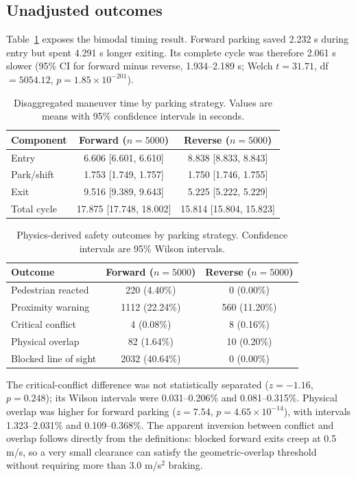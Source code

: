 \documentclass[11pt]{article}
\begin{document}
\subsection{Unadjusted outcomes}

Table~\ref{tab:time} exposes the bimodal timing result. Forward parking saved 2.232 s during entry but spent 4.291 s longer exiting. Its complete cycle was therefore 2.061 s slower (95\% CI for forward minus reverse, 1.934--2.189 s; Welch $t=31.71$, df $=5054.12$, $p=1.85\times10^{-201}$).

\begin{table}[ht]
\centering
\caption{Disaggregated maneuver time by parking strategy. Values are means with 95\% confidence intervals in seconds.}
\label{tab:time}
\begin{tabular}{lcc}
\toprule
Component & Forward ($n=5000$) & Reverse ($n=5000$)\\
\midrule
Entry & 6.606 [6.601, 6.610] & 8.838 [8.833, 8.843]\\
Park/shift & 1.753 [1.749, 1.757] & 1.750 [1.746, 1.755]\\
Exit & 9.516 [9.389, 9.643] & 5.225 [5.222, 5.229]\\
Total cycle & 17.875 [17.748, 18.002] & 15.814 [15.804, 15.823]\\
\bottomrule
\end{tabular}
\end{table}

\begin{table}[ht]
\centering
\caption{Physics-derived safety outcomes by parking strategy. Confidence intervals are 95\% Wilson intervals.}
\label{tab:results}
\begin{tabular}{lcc}
\toprule
Outcome & Forward ($n=5000$) & Reverse ($n=5000$)\\
\midrule
Pedestrian reacted & 220 (4.40\%) & 0 (0.00\%)\\
Proximity warning & 1112 (22.24\%) & 560 (11.20\%)\\
Critical conflict & 4 (0.08\%) & 8 (0.16\%)\\
Physical overlap & 82 (1.64\%) & 10 (0.20\%)\\
Blocked line of sight & 2032 (40.64\%) & 0 (0.00\%)\\
\bottomrule
\end{tabular}
\end{table}

The critical-conflict difference was not statistically separated ($z=-1.16$, $p=0.248$); its Wilson intervals were 0.031--0.206\% and 0.081--0.315\%. Physical overlap was higher for forward parking ($z=7.54$, $p=4.65\times10^{-14}$), with intervals 1.323--2.031\% and 0.109--0.368\%. The apparent inversion between conflict and overlap follows directly from the definitions: blocked forward exits creep at 0.5 m/s, so a very small clearance can satisfy the geometric-overlap threshold without requiring more than 3.0 m/s$^2$ braking.
\end{document}
